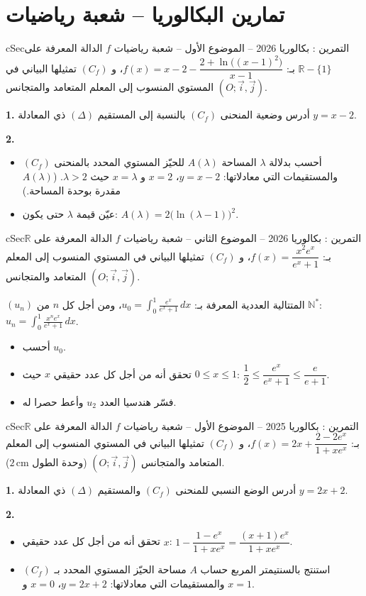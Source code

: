 \documentclass[12pt,a4paper]{article}
\newenvironment{BOX}[2]{\begin{otherlanguage}{english}\begin{arbox}{#1}{#2}}{\end{arbox}\end{otherlanguage}}
\newcounter{exo}
\newenvironment{tamrin}[1]{\stepcounter{exo}\begin{BOX}{cSec}{التمرين \theexo: #1}}{\end{BOX}}
\newcommand{\N}{\mathbb{N}}
\newcommand{\R}{\mathbb{R}}
\newenvironment{sq}{\begin{itemize}[leftmargin=2.4em,itemsep=3pt]}{\end{itemize}}
\newcommand{\qa}{\item[(أ)]}\newcommand{\qb}{\item[(ب)]}\newcommand{\qc}{\item[(جـ)]}\newcommand{\qd}{\item[(د)]}\newcommand{\qe}{\item[(هـ)]}
\newcommand{\QQ}[1]{\par\smallskip\textbf{#1.} }
\begin{document}
\section{تمارين البكالوريا -- شعبة رياضيات}
\begin{tamrin}{بكالوريا 2026 -- الموضوع الأول -- شعبة رياضيات}
$f$ الدالة المعرفة على $\R-\{1\}$ بـ: $f(x)=x-2-\dfrac{2+\ln\big((x-1)^2\big)}{x-1}$،
و $(C_f)$ تمثيلها البياني في المستوي المنسوب إلى المعلم المتعامد والمتجانس $(O;\vec i,\vec j)$.
\QQ{1} أدرس وضعية المنحنى $(C_f)$ بالنسبة إلى المستقيم $(\Delta)$ ذي المعادلة $y=x-2$.
\QQ{2}
\begin{sq}
\qa أحسب بدلالة $\lambda$ المساحة $A(\lambda)$ للحيّز المستوي المحدد بالمنحنى $(C_f)$ والمستقيمات التي معادلاتها: $y=x-2$، $x=2$ و $x=\lambda$ حيث $\lambda>2$. ($A(\lambda)$ مقدرة بوحدة المساحة.)
\qb عيّن قيمة $\lambda$ حتى يكون: $A(\lambda)=2\big(\ln(\lambda-1)\big)^2$.
\end{sq}
\end{tamrin}

\begin{tamrin}{بكالوريا 2026 -- الموضوع الثاني -- شعبة رياضيات}
$f$ الدالة المعرفة على $\R$ بـ: $f(x)=\dfrac{x^2e^x}{e^x+1}$، و $(C_f)$ تمثيلها البياني في المستوي المنسوب إلى المعلم المتعامد والمتجانس $(O;\vec i,\vec j)$.

$(u_n)$ المتتالية العددية المعرفة بـ: $u_0=\displaystyle\int_0^1\frac{e^x}{e^x+1}\,dx$، ومن أجل كل $n$ من $\N^*$: $u_n=\displaystyle\int_0^1\frac{x^ne^x}{e^x+1}\,dx$.
\begin{sq}
\qa أحسب $u_0$.
\qb تحقق أنه من أجل كل عدد حقيقي $x$ حيث $0\le x\le 1$: $\dfrac12\le\dfrac{e^x}{e^x+1}\le\dfrac{e}{e+1}$.
\qc فسّر هندسيا العدد $u_2$ وأعط حصرا له.
\end{sq}
\end{tamrin}

\begin{tamrin}{بكالوريا 2025 -- الموضوع الأول -- شعبة رياضيات}
$f$ الدالة المعرفة على $\R$ بـ: $f(x)=2x+\dfrac{2-2e^x}{1+xe^x}$، و $(C_f)$ تمثيلها البياني في المستوي المنسوب إلى المعلم المتعامد والمتجانس $(O;\vec i,\vec j)$ (وحدة الطول $2\,\text{cm}$).
\QQ{1} أدرس الوضع النسبي للمنحنى $(C_f)$ والمستقيم $(\Delta)$ ذي المعادلة $y=2x+2$.
\QQ{2}
\begin{sq}
\qa تحقق أنه من أجل كل عدد حقيقي $x$: $1-\dfrac{1-e^x}{1+xe^x}=\dfrac{(x+1)e^x}{1+xe^x}$.
\qb استنتج بالسنتيمتر المربع حساب $A$ مساحة الحيّز المستوي المحدد بـ $(C_f)$ والمستقيمات التي معادلاتها: $y=2x+2$، $x=0$ و $x=1$.
\end{sq}
\end{tamrin}
\end{document}
